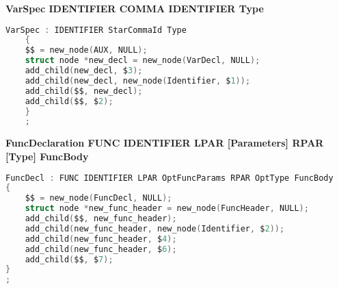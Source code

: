 \documentclass[12pt]{article}
\begin{document}
\begin{itemize}
    \begin{center}
        \small\textbf{VarSpec \textendash{} IDENTIFIER {COMMA IDENTIFIER} Type}
    \end{center}
    \begin{center}
    \begin{lstlisting}[language=C, basicstyle=\small\ttfamily]
VarSpec : IDENTIFIER StarCommaId Type
    {
    $$ = new_node(AUX, NULL);
    struct node *new_decl = new_node(VarDecl, NULL);
    add_child(new_decl, $3);
    add_child(new_decl, new_node(Identifier, $1));
    add_child($$, new_decl);
    add_child($$, $2);
    }
    ;
    \end{lstlisting}
    \end{center}
    \begin{center}
        \small\textbf{FuncDeclaration \textendash{} FUNC IDENTIFIER LPAR [Parameters] RPAR [Type] FuncBody}
    \end{center}
    \begin{center}
    \begin{lstlisting}[language=C, basicstyle=\small\ttfamily]
FuncDecl : FUNC IDENTIFIER LPAR OptFuncParams RPAR OptType FuncBody
{
    $$ = new_node(FuncDecl, NULL);
    struct node *new_func_header = new_node(FuncHeader, NULL);
    add_child($$, new_func_header);
    add_child(new_func_header, new_node(Identifier, $2));
    add_child(new_func_header, $4);
    add_child(new_func_header, $6);
    add_child($$, $7);
}
;
    \end{lstlisting}
    \end{center}
\end{itemize}
\end{document}
